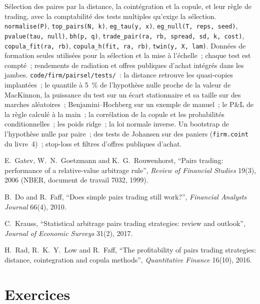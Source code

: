 \begin{build}
 Sélection des paires par la distance, la cointégration et la copule, et leur règle de trading, avec la comptabilité des tests multiples qu'exige la sélection.
 \texttt{normalise(P)}, \texttt{top\_pairs(N, k)}, \texttt{eg\_tau(y, x)}, \texttt{eg\_null(T, reps, seed)}, \texttt{pvalue(tau, null)},
\texttt{bh(p, q)}, \texttt{trade\_pair(ra, rb, spread, sd, k, cost)}, \texttt{copula\_fit(ra, rb)}, \texttt{copula\_h(fit, ra, rb)}, \texttt{twin(y, X, lam)}.
 Données de formation seules utilisées pour la sélection et la mise à l'échelle~; chaque test est compté~; rendements de radiation et offres publiques d'achat intégrés dans les jambes.
 \texttt{code/firm/pairsel/tests/}~: la distance retrouve les quasi-copies implantées~; le quantile à 5~\% de l'hypothèse nulle proche de la valeur de MacKinnon, la puissance du test
sur un écart stationnaire et sa taille sur des marches aléatoires~; Benjamini--Hochberg sur un exemple de manuel~; le P\&L de la règle calculé à la main~; la corrélation de la copule et
les probabilités conditionnelles~; les poids ridge~; la loi normale inverse.
 Un bootstrap de l'hypothèse nulle par paire~; des tests de Johansen sur des paniers (\texttt{firm.coint} du livre~4)~; stop-loss et filtres d'offres publiques d'achat.
\end{build}

\begin{omsources}
\item E.~Gatev, W.~N.~Goetzmann and K.~G.~Rouwenhorst, ``Pairs trading: performance of a relative-value arbitrage rule'', \emph{Review of Financial Studies}
19(3), 2006 (NBER, document de travail 7032, 1999).
\item B.~Do and R.~Faff, ``Does simple pairs trading still work?'', \emph{Financial Analysts Journal} 66(4), 2010.
\item C.~Krauss, ``Statistical arbitrage pairs trading strategies: review and outlook'', \emph{Journal of Economic Surveys} 31(2), 2017.
\item H.~Rad, R.~K.~Y.~Low and R.~Faff, ``The profitability of pairs trading strategies: distance, cointegration and copula methods'', \emph{Quantitative
Finance} 16(10), 2016.
\end{omsources}

\section{Exercices}

